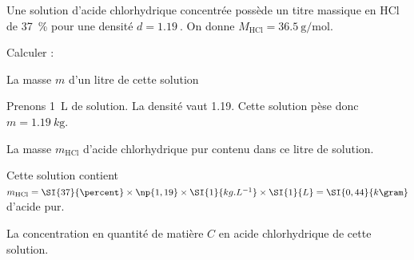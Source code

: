 \debutEntrainement

Une solution d'acide chlorhydrique concentrée possède un titre massique en $\textrm{H}\textrm{Cl}$ de \SI{37}{\percent} pour une densité $d=\SI{1,19}{}$. On donne $M_{\textrm{H}\textrm{Cl}}=\SI{36,5}{\gram\per\mole}$. 

Calculer : 


\begin{enonce}
La masse $m$ d'un litre de cette solution
\end{enonce}


\begin{corrige}
Prenons \SI{1}{\liter} de solution. La densité vaut \SI{1,19}{}. Cette solution pèse donc $m=\SI{1,19}{k\gram}$. 
\end{corrige}


\begin{enonce}
La masse $m_{\textrm{H}\textrm{Cl}}$ d'acide chlorhydrique pur contenu dans ce litre de solution.

\end{enonce}


\begin{corrige}
Cette solution contient $m_{\textrm{H}\textrm{Cl}}=\SI{37}{\percent}\times \np{1,19}\times\SI{1}{kg.L^{-1}} \times\SI{1}{L}=\SI{0,44}{k\gram}$ d'acide pur. 
\end{corrige}



\begin{enonce}
La concentration en quantité de matière $C$ en acide chlorhydrique de cette solution.

\end{enonce}

